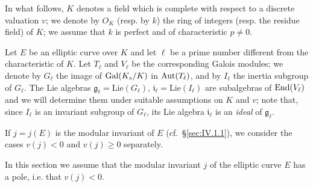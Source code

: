 

In what follows, $K$ denotes a field which is complete with respect to a
discrete valuation $v$; we denote by $O_K$ (resp. by $k$) the ring of
integers (resp. the residue field) of $K$; we assume that $k$ is perfect
and of characteristic $p\neq 0$.

Let $E$ be an elliptic curve over $K$ and let $\ell$ be a prime number
different from the characteristic of $K$. Let $T_\ell$ and $V_\ell$ be
the corresponding Galois modules; we denote by $G_\ell$ the image of
$\mathrm{Gal}(K_s/K)$ in $\mathrm{Aut}(T_\ell)$, and by $I_\ell$ the inertia subgroup of
$G_\ell$. The Lie algebras $\mathfrak{g}_\ell=\mathrm{Lie}(G_\ell)$,
$\mathfrak{i}_\ell=\mathrm{Lie}(I_\ell)$ are subalgebras of $\mathrm{End}(V_\ell)$
and we will determine them under suitable assumptions on $K$ and $v$;
note that, since $I_\ell$ is an invariant subgroup of $G_\ell$, its Lie
algebra $\mathfrak{i}_\ell$ is an \emph{ideal} of $\mathfrak{g}_\ell$.

If $j=j(E)$ is the modular invariant of $E$ (cf.~\S\ref{sec:IV.1.1}), we
consider the cases $v(j)<0$ and $v(j)\geq 0$ separately.


In this section we assume that the modular invariant $j$ of the elliptic
curve $E$ has a pole, i.e. that $v(j)<0$.


